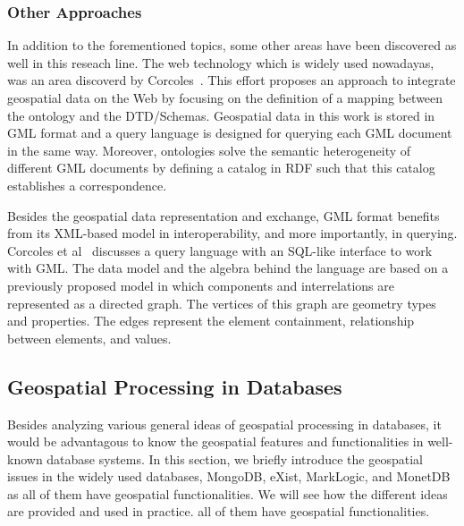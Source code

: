 \documentclass[a4paper,12pt]{article}
\begin{document}
\subsubsection{Other Approaches}
\label{others}
In addition to the forementioned topics, some other areas have been discovered as well in this reseach line. The web technology which is widely used nowadayas, was an area discoverd by Corcoles~\cite{corcoles2003}. This effort proposes an approach to integrate geospatial data 
on the Web by focusing on the definition of a mapping between the ontology and the DTD/Schemas. 
Geospatial data in this work is stored in GML format and a query language is designed for querying each GML document in the same way. 
Moreover, ontologies solve the semantic heterogeneity of different GML documents 
by defining a catalog in RDF such that this catalog establishes a correspondence.

Besides the geospatial data representation and exchange, GML format benefits from its XML-based model in interoperability, and more importantly, in querying. Corcoles et al~\cite{corcoles2001} discusses a query language with an SQL-like interface to work with GML. The data model and the algebra behind the language are based on a previously proposed model in which components and interrelations are represented as a directed graph. The vertices of this graph are geometry types and properties. 
The edges represent the element containment, relationship between elements, and values. 

\subsection{Geospatial Processing in Databases} 
\label{s.dbs}
Besides analyzing various general ideas of geospatial processing in databases, it would be advantagous to know the geospatial features and functionalities in well-known database systems. In this section, we briefly introduce the geospatial issues in the widely used databases, MongoDB, eXist, MarkLogic, and MonetDB as all of them have geospatial functionalities. We will see how the different ideas are provided and used in practice. 
all of them have geospatial functionalities.
\end{document}
